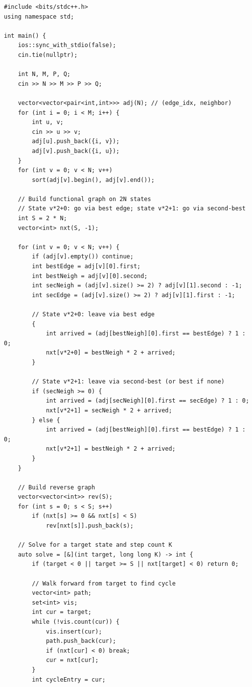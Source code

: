 \documentclass[11pt,a4paper]{article}
\begin{document}
\begin{lstlisting}
#include <bits/stdc++.h>
using namespace std;

int main() {
    ios::sync_with_stdio(false);
    cin.tie(nullptr);

    int N, M, P, Q;
    cin >> N >> M >> P >> Q;

    vector<vector<pair<int,int>>> adj(N); // (edge_idx, neighbor)
    for (int i = 0; i < M; i++) {
        int u, v;
        cin >> u >> v;
        adj[u].push_back({i, v});
        adj[v].push_back({i, u});
    }
    for (int v = 0; v < N; v++)
        sort(adj[v].begin(), adj[v].end());

    // Build functional graph on 2N states
    // State v*2+0: go via best edge; state v*2+1: go via second-best
    int S = 2 * N;
    vector<int> nxt(S, -1);

    for (int v = 0; v < N; v++) {
        if (adj[v].empty()) continue;
        int bestEdge = adj[v][0].first;
        int bestNeigh = adj[v][0].second;
        int secNeigh = (adj[v].size() >= 2) ? adj[v][1].second : -1;
        int secEdge = (adj[v].size() >= 2) ? adj[v][1].first : -1;

        // State v*2+0: leave via best edge
        {
            int arrived = (adj[bestNeigh][0].first == bestEdge) ? 1 : 0;
            nxt[v*2+0] = bestNeigh * 2 + arrived;
        }

        // State v*2+1: leave via second-best (or best if none)
        if (secNeigh >= 0) {
            int arrived = (adj[secNeigh][0].first == secEdge) ? 1 : 0;
            nxt[v*2+1] = secNeigh * 2 + arrived;
        } else {
            int arrived = (adj[bestNeigh][0].first == bestEdge) ? 1 : 0;
            nxt[v*2+1] = bestNeigh * 2 + arrived;
        }
    }

    // Build reverse graph
    vector<vector<int>> rev(S);
    for (int s = 0; s < S; s++)
        if (nxt[s] >= 0 && nxt[s] < S)
            rev[nxt[s]].push_back(s);

    // Solve for a target state and step count K
    auto solve = [&](int target, long long K) -> int {
        if (target < 0 || target >= S || nxt[target] < 0) return 0;

        // Walk forward from target to find cycle
        vector<int> path;
        set<int> vis;
        int cur = target;
        while (!vis.count(cur)) {
            vis.insert(cur);
            path.push_back(cur);
            if (nxt[cur] < 0) break;
            cur = nxt[cur];
        }
        int cycleEntry = cur;


\end{lstlisting}
\end{document}
